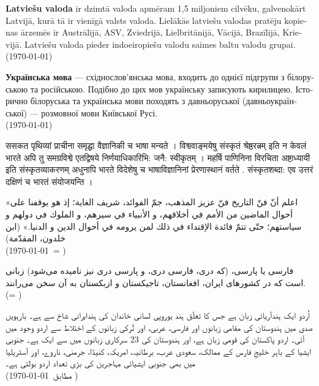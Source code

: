 \documentclass[a4paper]{article}
\begin{document}
\begin{latvian} 
\textbf{Latviešu valoda} ir dzimtā valoda apmēram 1,5 miljoniem cilvēku, galvenokārt Latvijā, kurā tā ir vienīgā valsts valoda. Lielākās latviešu valodas pratēju kopienas ārzemēs ir Austrālijā, ASV, Zviedrijā, Lielbritānijā, Vācijā, Brazīlijā, Krievijā. Latviešu valoda pieder indoeiropiešu valodu saimes baltu valodu grupai.\\
(\today)
\end{latvian}

\begin{ukrainian}
\textbf{Українська мова} — східнослов'янська мова, входить до однієї підгрупи з білоруською та російською. Подібно до цих мов українську записують кирилицею. Історично білоруська та українська мови походять з давньоруської (давньоукраїнської) — розмовної мови Київської Русі.\\
(\today)
\end{ukrainian}

\begin{sanskrit}
{\Large ससकत} पृथिव्यां प्राचीना समृद्घा वैज्ञानिकी च भाषा मन्यते । विश्ववाङ्‌मयेषु संस्कृतं श्रेष्ठरत्नम् इति न केवलं भारते अपि तु समग्रविश्वे एतद्विषये निर्णयाधिकारिभि: जनै: स्वीकृतम् । महर्षि पाणिनिना विरचिता अष्टाध्यायी इति संस्कृतव्याकरणम्‌ अधुनापि भारते विदेशेषु च भाषाविज्ञानिनां प्रेरणास्‍थानं वर्तते . संस्कृतशब्दा: एव उत्तरं दक्षिणं च भारतं संयोजयन्ति ।
\end{sanskrit}

\begin{Arabic}[]
«اعلم أنّ فنّ التاريخ فنّ عزيز المذهب، جمّ الفوائد، شريف الغاية؛ إذ هو يوقفنا على أحوال الماضين من الأمم في أخلاقهم، و الأنبياء في سيرهم، و الملوك في دولهم و سياستهم؛ حتّى تتمّ فائدة الإقتداء في ذلك لمن يرومه في أحوال الدين و الدنيا.» (ابن خلدون، المقدّمة)\\
(\today\ = \Hijritoday[0])
\end{Arabic}

\begin{farsi}
فارسی یا پارسی، (که دری، فارسی دری، و پارسی دری نیز نامیده می‌شود) زبانی است که
در کشورهای ایران، افغانستان، تاجیکستان و ازبکستان به آن سخن می‌رانند. \\
(\Jalalitoday = \Hijritoday)
\end{farsi}

\pagebreak
\begin{urdu}
اُردو ایک ہندآریائی زبان ہے جس کا تعلّق ہند یوروپی لسانی خاندان کی ہندایرانی شاخ سے ہے۔ بارہویں صدی میں ہندوستان کی مقامی زبانوں اور فارسی، عربی، اور تُرکی زبانوں کے اختلاط سے اردو وجود میں آئی۔ اردو پاکستان کی قومی زبان ہے، اور ہندوستان کی 23 سرکاری زبانوں میں سے ایک ہے۔ جنوبی ایشیا کے باہر خلیجِ فارس کے ممالک، سعودی عرب، برطانیہ، امریکہ، کنیڈا، جرمنی، ناروے، اور آسٹریلیا میں بھی جنوبی ایشیائی مہاجرین کی بڑی تعداد اردو بولتی ہے۔ \\

(\today\ مطابق \Hijritoday[0])
\end{urdu}
\end{document}
